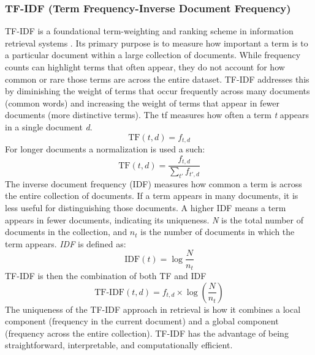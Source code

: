 \subsubsection{TF-IDF (Term Frequency-Inverse Document Frequency)}
TF-IDF is a foundational term-weighting and ranking scheme in information retrieval systems \cite{tf-idf}. Its primary purpose is to measure how important a term is to a particular document within a large collection of documents. While frequency counts can highlight terms that often appear, they do not account for how common or rare those terms are across the entire dataset. TF-IDF addresses this by diminishing the weight of terms that occur frequently across many documents (common words)  and increasing the weight of terms that appear in fewer documents (more distinctive terms).
The \gls{tf} measures how often a term \textit{t} appears in a single document \textit{d}. 
\begin{equation}
    \label{eq:tf} 
    \text{TF}(t,d)=f_{t,d}
\end{equation}
For longer documents a normalization is used a such:
\begin{equation}
    \label{eq:tf(t,d)}
    \text{TF}(t,d) = \frac{f_{t,d}}{\sum_{t'}f_{t',d}}
\end{equation}
The inverse document frequency (IDF) measures how common a term is across the entire collection of documents. If a term appears in many documents, it is less useful for distinguishing those documents. A higher IDF means a term appears in fewer documents, indicating its uniqueness. \textit{N} is the total number of documents in the collection, and $n_t$ is the number of documents in which the term appears. \textit{IDF} is defined as:
\begin{equation}
    \label{eq:idftf}
    \text{IDF}(t)=\log\frac{N}{n_t}
\end{equation}
TF-IDF is then the combination of both TF and IDF
\begin{equation}
    \label{eq:tfidf}
    \text{TF-IDF}(t,d) = f_{t,d} \times \log\left(\frac{N}{n_t}\right)
\end{equation}
The uniqueness of the TF-IDF approach in retrieval is how it combines a local component (frequency in the current document) and a global component (frequency across the entire collection). TF-IDF has the advantage of being straightforward, interpretable, and computationally efficient.

